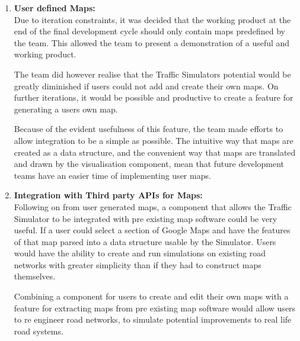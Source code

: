 \documentclass[11pt]{article}
\begin{document}
{\begin{enumerate}
	@TODO - Perhaps add some more stuff here?\\
	
	\item \textbf{User defined Maps:} 
	\\
	
	Due to iteration constraints, it was decided that the working product at the end of the final development cycle should only contain maps predefined by the team. This allowed the team to present a demonstration of a useful and working product.
	
	The team did however realise that the Traffic Simulators potential would be greatly diminished if users could not add and create their own maps. On further iterations, it would be possible and productive to create a feature for generating a users own map.
	
	Because of the evident usefulness of this feature, the team made efforts to allow integration to be a simple as possible. The intuitive way that maps are created as a data structure, and the convenient way that maps are translated and drawn by the visualisation component, mean that future development teams have an easier time of implementing user maps.\\
	
	
	\item \textbf{Integration with Third party APIs for Maps:} 
	\\
	
	Following on from user generated maps, a component that allows the Traffic Simulator to be integrated with pre existing map software could be very useful. If a user could select a section of Google Maps and have the features of that map parsed into a data structure usable by the Simulator. Users would have the ability to create and run simulations on existing road networks with greater simplicity than if they had to construct maps themselves.
	
	Combining a component for users to create and edit their own maps with a feature for extracting maps from pre existing map software would allow users to re engineer road networks, to simulate potential improvements to real life road systems.
	
\end{enumerate}

	
}
\end{document}
